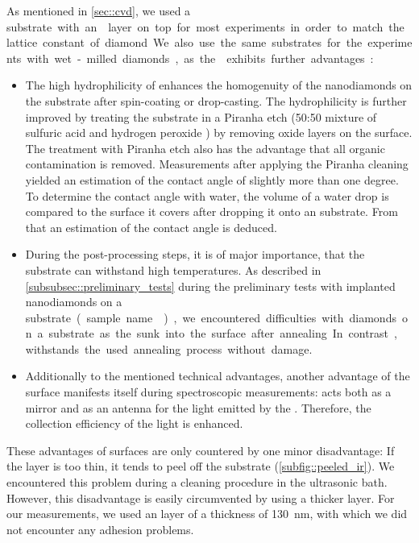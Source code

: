 	As mentioned in \autoref{sec::cvd}, we used a \si substrate with an \ir layer on top for most experiments in order to match the lattice constant of diamond.
	We also use the same substrates for the experiments with wet-milled diamonds, as the \ir exhibits further advantages:
	\begin{itemize}
		\item The high hydrophilicity of \ir {} enhances the homogenuity of the nanodiamonds on the substrate after spin-coating or drop-casting.
		The hydrophilicity is further improved by treating the substrate in a Piranha etch (50:50 mixture of sulfuric acid  and hydrogen peroxide ) by removing oxide layers on the surface.
		The treatment with Piranha etch also has the advantage that all organic contamination is removed.
		Measurements after applying the Piranha cleaning yielded an estimation of the contact angle of slightly more than one degree.
		To determine the contact angle with water, the volume of a water drop is compared to the surface it covers after dropping it onto an \ir substrate.
		From that an estimation of the contact angle is deduced.
		\item During the post-processing steps, it is of major importance, that the substrate can withstand high temperatures.
		As described in \autoref{subsubsec::preliminary_tests} during the preliminary tests with implanted nanodiamonds on a \si substrate (sample name ), we encountered difficulties with diamonds on a \si substrate as the sunk into the surface after annealing.
		In contrast, \ir withstands the used annealing process without damage.
		\item Additionally to the mentioned technical advantages, another advantage of the \ir surface manifests itself during spectroscopic measurements:
{}		\Ir acts both as a mirror and as an antenna for the \fl light emitted by the \siv \cite{Neu2012a}.
		Therefore, the collection efficiency of the \fl light is enhanced.
	\end{itemize}
	These advantages of \ir surfaces are only countered by one minor disadvantage:
	If the \ir layer is too thin, it tends to peel off the substrate (\autoref{subfig::peeled_ir}).
	We encountered this problem during a cleaning procedure in the ultrasonic bath.
	However, this disadvantage is easily circumvented by using a thicker \ir layer.
	For our measurements, we used an \ir layer of a thickness of \SI{130}{nm}, with which we did not encounter any adhesion problems.

